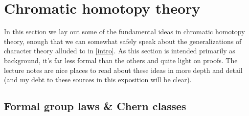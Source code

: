 \section{Chromatic homotopy theory}
\label{chrom}

\newcommand{\CP}{\lC\lP}

In this section we lay out some of the fundamental ideas in chromatic
homotopy theory, enough that we can somewhat safely speak about the
generalizations of character theory alluded to in \cref{intro}. As
this section is intended primarily as background, it's far less formal
than the others and quite light on proofs. The lecture notes
\cite{hopkins-coctalos,lurie-chromatic} are nice places to read about
these ideas in more depth and detail (and my debt to these sources in
this exposition will be clear).

\subsection{Formal group laws \& Chern classes}


